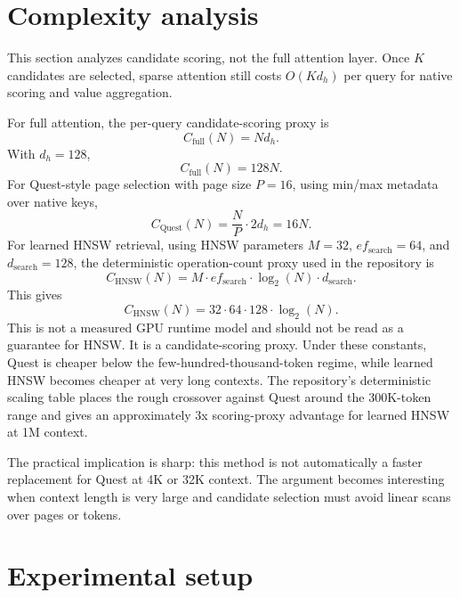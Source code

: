 \documentclass[10pt]{article}
\begin{document}
\section{Complexity analysis}
This section analyzes candidate scoring, not the full attention layer. Once
$K$ candidates are selected, sparse attention still costs $O(Kd_h)$ per query
for native scoring and value aggregation.

For full attention, the per-query candidate-scoring proxy is
\begin{equation}
    C_{\mathrm{full}}(N)=Nd_h.
\end{equation}
With $d_h=128$,
\begin{equation}
    C_{\mathrm{full}}(N)=128N.
\end{equation}
For Quest-style page selection with page size $P=16$, using min/max metadata
over native keys,
\begin{equation}
    C_{\mathrm{Quest}}(N)=\frac{N}{P}\cdot 2d_h=16N.
\end{equation}
For learned HNSW retrieval, using HNSW parameters $M=32$,
$ef_{\mathrm{search}}=64$, and $d_{\mathrm{search}}=128$, the deterministic
operation-count proxy used in the repository is
\begin{equation}
    C_{\mathrm{HNSW}}(N)=M\cdot ef_{\mathrm{search}}\cdot \log_2(N)\cdot d_{\mathrm{search}}.
\end{equation}
This gives
\begin{equation}
    C_{\mathrm{HNSW}}(N)=32\cdot64\cdot128\cdot\log_2(N).
\end{equation}
This is not a measured GPU runtime model and should not be read as a guarantee
for HNSW. It is a candidate-scoring proxy. Under these constants, Quest is
cheaper below the few-hundred-thousand-token regime, while learned HNSW becomes
cheaper at very long contexts. The repository's deterministic scaling table
places the rough crossover against Quest around the 300K-token range and gives
an approximately 3x scoring-proxy advantage for learned HNSW at 1M context.

The practical implication is sharp: this method is not automatically a faster
replacement for Quest at 4K or 32K context. The argument becomes interesting
when context length is very large and candidate selection must avoid linear
scans over pages or tokens.

\section{Experimental setup}
\end{document}

